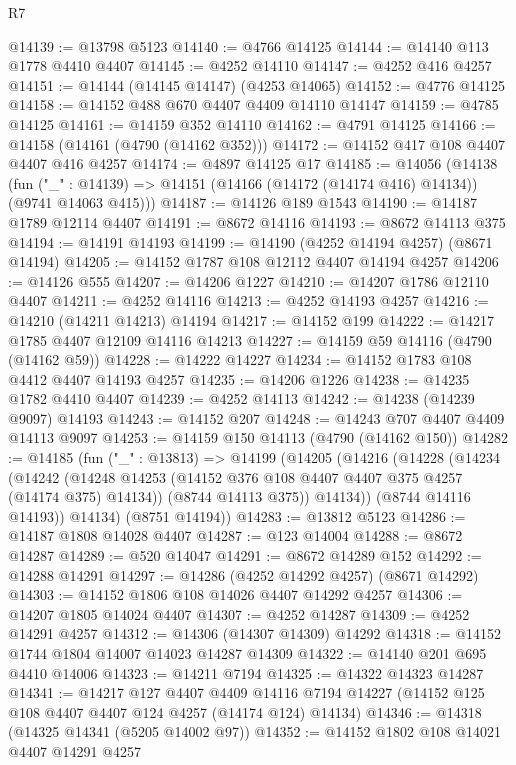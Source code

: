 \begin{lexlean}{R7}
\begin{coremodule}
@14139 := @13798 @5123
@14140 := @4766 @14125
@14144 := @14140 @113 @1778 @4410 @4407
@14145 := @4252 @14110
@14147 := @4252 @416 @4257
@14151 := @14144 (@14145 @14147) (@4253 @14065)
@14152 := @4776 @14125
@14158 := @14152 @488 @670 @4407 @4409 @14110 @14147
@14159 := @4785 @14125
@14161 := @14159 @352 @14110
@14162 := @4791 @14125
@14166 := @14158 (@14161 (@4790 (@14162 @352)))
@14172 := @14152 @417 @108 @4407 @4407 @416 @4257
@14174 := @4897 @14125 @17
@14185 := @14056
    (@14138
      (fun ("_" : @14139) => @14151 (@14166 (@14172 (@14174 @416) @14134)) (@9741 @14063 @415)))
@14187 := @14126 @189 @1543
@14190 := @14187 @1789 @12114 @4407
@14191 := @8672 @14116
@14193 := @8672 @14113 @375
@14194 := @14191 @14193
@14199 := @14190 (@4252 @14194 @4257) (@8671 @14194)
@14205 := @14152 @1787 @108 @12112 @4407 @14194 @4257
@14206 := @14126 @555
@14207 := @14206 @1227
@14210 := @14207 @1786 @12110 @4407
@14211 := @4252 @14116
@14213 := @4252 @14193 @4257
@14216 := @14210 (@14211 @14213) @14194
@14217 := @14152 @199
@14222 := @14217 @1785 @4407 @12109 @14116 @14213
@14227 := @14159 @59 @14116 (@4790 (@14162 @59))
@14228 := @14222 @14227
@14234 := @14152 @1783 @108 @4412 @4407 @14193 @4257
@14235 := @14206 @1226
@14238 := @14235 @1782 @4410 @4407
@14239 := @4252 @14113
@14242 := @14238 (@14239 @9097) @14193
@14243 := @14152 @207
@14248 := @14243 @707 @4407 @4409 @14113 @9097
@14253 := @14159 @150 @14113 (@4790 (@14162 @150))
@14282 := @14185
    (fun ("_" : @13813) =>
    @14199
      (@14205
        (@14216
          (@14228
            (@14234
              (@14242
                (@14248 @14253 (@14152 @376 @108 @4407 @4407 @375 @4257 (@14174 @375) @14134))
                (@8744 @14113 @375))
              @14134))
          (@8744 @14116 @14193))
        @14134)
      (@8751 @14194))
@14283 := @13812 @5123
@14286 := @14187 @1808 @14028 @4407
@14287 := @123 @14004
@14288 := @8672 @14287
@14289 := @520 @14047
@14291 := @8672 @14289 @152
@14292 := @14288 @14291
@14297 := @14286 (@4252 @14292 @4257) (@8671 @14292)
@14303 := @14152 @1806 @108 @14026 @4407 @14292 @4257
@14306 := @14207 @1805 @14024 @4407
@14307 := @4252 @14287
@14309 := @4252 @14291 @4257
@14312 := @14306 (@14307 @14309) @14292
@14318 := @14152 @1744 @1804 @14007 @14023 @14287 @14309
@14322 := @14140 @201 @695 @4410 @14006
@14323 := @14211 @7194
@14325 := @14322 @14323 @14287
@14341 := @14217
    @127
    @4407
    @4409
    @14116
    @7194
    @14227
    (@14152 @125 @108 @4407 @4407 @124 @4257 (@14174 @124) @14134)
@14346 := @14318 (@14325 @14341 (@5205 @14002 @97))
@14352 := @14152 @1802 @108 @14021 @4407 @14291 @4257

\end{coremodule}
\end{lexlean}
